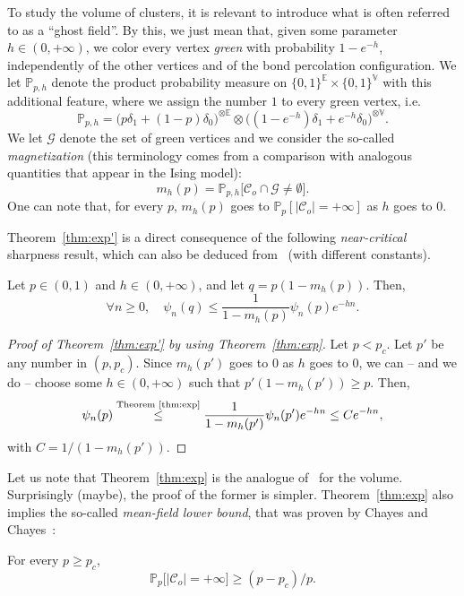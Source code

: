 \documentclass[AHL,Unicode,longabstracts,published]{cedram}
\newcommand{\E}{\mathbb{E}}
\newcommand{\V}{\mathbb{V}}
\newcommand{\Pro}{\mathbb{P}}
\newcommand{\calC}{\mathcal{C}}
\newcommand{\calG}{\mathcal{G}}
\let\oldforall\forall
\renewcommand*{\forall}{\mathrel{\oldforall}}
\begin{document}
To study the volume of clusters, it is relevant to introduce what is often referred to as a ``ghost field''. By this, we just mean that, given some parameter $h \in (0,+\infty)$, we color every vertex \emph{green} with probability $1-e^{-h}$, independently of the other vertices and of the bond percolation configuration. We let $\Pro_{p,h}$ denote the product probability measure on $\{0,1\}^{\E} \times \{0,1\}^{\V}$ with this additional feature, where we assign the number $1$ to every green vertex, i.e.
\[
\Pro_{p,h} = \big(p\delta_1+(1-p)\delta_0\big)^{\otimes \E} \otimes \big((1-e^{-h})\delta_1+e^{-h}\delta_0\big)^{\otimes \V}.
\]
We let $\calG$ denote the set of green vertices and we consider the so-called \emph{magnetization} (this terminology comes from a comparison with analogous quantities that appear in the Ising model):
\[
m_h(p)=\Pro_{p,h} \big[\calC_o \cap \calG \ne \emptyset \big].
\]
One can note that, for every $p$, $m_h(p)$ goes to $\Pro_p[|\calC_o|=+\infty]$ as $h$ goes to $0$.



Theorem~\ref{thm:exp'} is a direct consequence of the following \emph{near-critical} sharpness result, which can also be deduced from~\cite{Hut20} (with different constants).

\begin{theo}\label{thm:exp}
Let $p\in(0,1)$ and $h\in(0,+\infty)$, and let $q=p(1-m_h(p))$. Then,
\[
\forall n \ge 0, \quad \psi_n(q) \le \frac{1}{1-m_h(p)} \psi_n(p) e^{-hn}.
\]
\end{theo}

\begin{proof}[Proof of Theorem~\ref{thm:exp'} by using Theorem~\ref{thm:exp}]
Let $p<p_c$. Let $p'$ be any number in $(p,p_c)$. Since $m_h(p')$ goes to $0$ as $h$ goes to $0$, we can -- and we do -- choose some $h\in(0,+\infty)$ such that $p'(1-m_h(p'))\ge p$. Then,
\[
\psi_n(p) \overset{\text{Theorem~\ref{thm:exp}}}{\le} \frac{1}{1-m_h(p')}\psi_n(p')e^{-hn} \le Ce^{-hn},
\]
with $C=1/(1-m_h(p'))$.
\end{proof}

Let us note that Theorem~\ref{thm:exp} is the analogue of~\cite[Theorem~1.1]{Van22} for the volume. Surprisingly (maybe), the proof of the former is simpler. Theorem~\ref{thm:exp} also implies the so-called \emph{mean-field lower bound}, that was proven by Chayes and Chayes~\cite{CC87}:

\begin{theo}\label{thm:mf}
For every $p\ge p_c$,
\[
\Pro_p\big[|\calC_o|=+\infty\big]\ge (p-p_c)/p.
\]
\end{theo}
\end{document}
